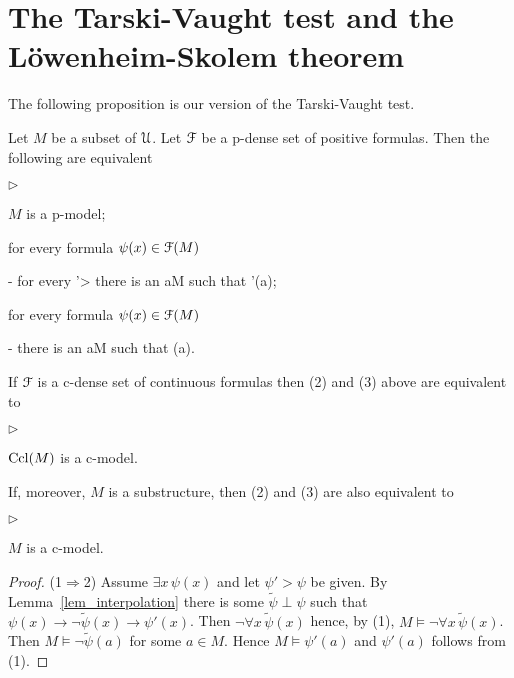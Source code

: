 \documentclass[10pt,oneside]{amsproc}
\newcommand{\mylabel}[1]{{#1}\hfill}
\renewenvironment{itemize}
  {\begin{list}{$\triangleright$}{%
  \setlength{\parskip}{0mm}
  \setlength{\topsep}{.4\baselineskip}
  \setlength{\rightmargin}{0mm}
  \setlength{\listparindent}{0mm}
  \setlength{\itemindent}{0mm}
  \setlength{\labelwidth}{3ex}
  \setlength{\itemsep}{.2\baselineskip}
  \setlength{\parsep}{.2\baselineskip}
  \setlength{\partopsep}{0mm}
  \setlength{\labelsep}{1ex}
  \setlength{\leftmargin}{\labelwidth+\labelsep}
  \let\makelabel\mylabel}}{%
\end{list}}
\begin{document}
{\section{The Tarski-Vaught test and the L\"owenheim-Skolem theorem}

The following proposition is our version of the Tarski-Vaught test.

\begin{theorem}\label{thm_Tarski_Vaught}
  Let $M$ be a subset of ${\EuScript U}$.
  Let ${\EuScript F}$ be a p-dense set of positive formulas.
  Then the following are equivalent
  \begin{itemize}
    \item[1.] $M$ is a p-model;
    \item[2.] for every formula $\psi(x)\in{\EuScript F}(M)$
    
    \noindent\kern-\leftmargin
    {\textrm{ for every }\psi'>\psi\textrm{ there is an }a\in M\textrm{ such that }\psi'(a);}
  
    \item[3.] for every formula $\psi(x)\in{\EuScript F}(M)$
    
    \noindent\kern-\leftmargin
    {\textrm{ there is an }a\in M\textrm{ such that }\neg\psi(a).}
  \end{itemize}
  If ${\EuScript F}$ is a c-dense set of continuous formulas then (2) and (3) above are equivalent to
  \begin{itemize}
    \item[1$'$.] ${\rm Ccl}(M)$ is a c-model.
  \end{itemize}
  If, moreover, $M$ is a substructure, then (2) and (3) are also equivalent to
  \begin{itemize}
    \item[1$''$.] $M$ is a c-model.
  \end{itemize}
\end{theorem}

\begin{proof}
  (1$\Rightarrow$2) Assume $\exists x\,\psi(x)$ and let $\psi'>\psi$ be given.
  By Lemma~\ref{lem_interpolation} there is some $\tilde{\psi}\perp\psi$ such that  $\psi(x)\rightarrow\neg\tilde{\psi}(x)\rightarrow\psi'(x)$.
  Then $\neg\forall x\,\tilde{\psi}(x)$ hence, by (1), $M\models\neg\forall x\,\tilde{\psi}(x)$.
  Then $M\models\neg\tilde{\psi}(a)$ for some $a\in M$. Hence $M\models\psi'(a)$ and $\psi'(a)$ follows from (1).


\end{proof}}
\end{document}
